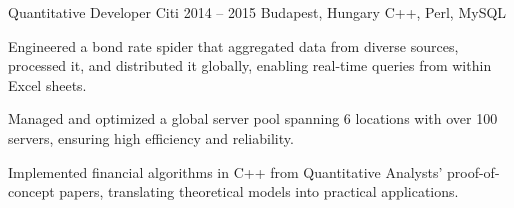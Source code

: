 \cvexperience
  {Quantitative Developer}
  {Citi}
  {2014 -- 2015}
  {Budapest, Hungary}
  {C++, Perl, MySQL}
  {%
    \item Engineered a bond rate spider that aggregated data from diverse sources, processed it, and distributed it globally, enabling real-time queries from within Excel sheets.
    \item Managed and optimized a global server pool spanning 6 locations with over 100 servers, ensuring high efficiency and reliability.
    \item Implemented financial algorithms in C++ from Quantitative Analysts' proof-of-concept papers, translating theoretical models into practical applications.
  }
